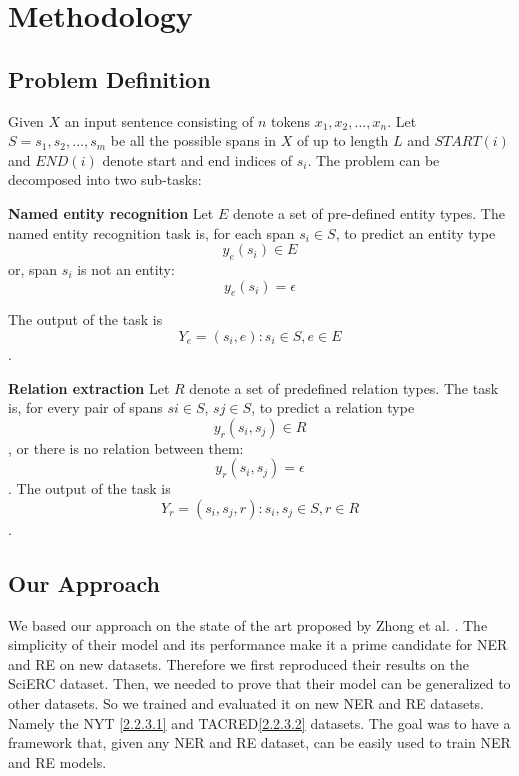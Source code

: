 \chapter{Methodology}
\label{chp:methodology}

\section{Problem Definition}
Given \(X\) an input sentence consisting of \(n\) tokens \(x_1,x_2,...,x_n\). Let \(S = {s_1, s_2,...,s_m}\) be all the possible spans in \(X\) of up to length \(L\) and \(START(i)\) and \(END(i)\) denote start and end indices of \(s_i\). The problem can be decomposed into two sub-tasks:

\textbf{Named entity recognition} Let \(E\) denote a set of pre-defined entity types. The named entity recognition task is, for each span \(s_i \in S\), to predict an entity type \[y_e(s_i) \in E\] or, span \(s_i\) is not an entity: \[y_e(s_i) =\epsilon\]

The output of the task is \[Y_e = {(s_i , e) : s_i \in S, e \in E}\].


\textbf{Relation extraction} Let \(R\) denote a set of predefined relation types. The task is, for every pair of spans \(si \in S\), \(sj \in S\), to predict a relation type \[y_r(s_i , s_j ) \in R\], or there is no relation between them: \[y_r(s_i , s_j ) =\epsilon\]. The output of the task is \[Y_r = {(s_i , s_j , r) : s_i , s_j \in S, r \in R}\].

\section{Our Approach}

We based our approach on the state of the art proposed by Zhong et al. \cite{Zhong2020AFE}. The simplicity of their model and its performance make it a prime candidate for NER and RE on new datasets. Therefore we first reproduced their results on the SciERC dataset. Then, we needed to prove that their model can be generalized to other datasets. So we trained and evaluated it on new NER and RE datasets. Namely the NYT \hyperref[sec:nytdataset]{[2.2.3.1]} and TACRED\hyperref[sec:tacreddataset]{[2.2.3.2]} datasets. The goal was to have a framework that, given any NER and RE dataset, can be easily used to train NER and RE models.\\


